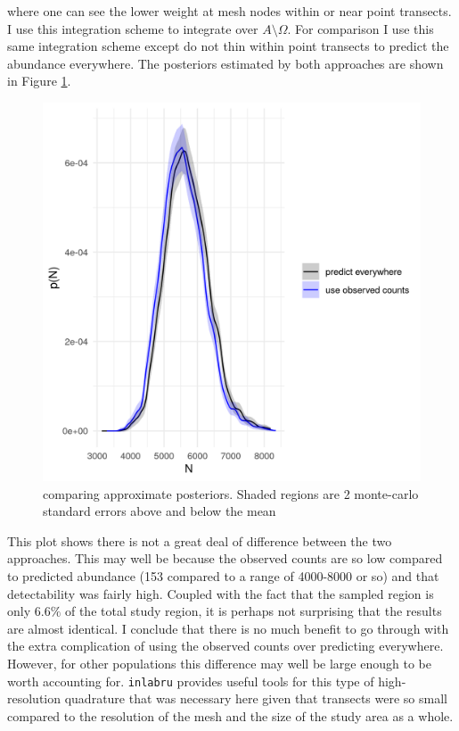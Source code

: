 \documentclass[12pt]{article}
\begin{document}
where one can see the lower weight at mesh nodes within or near point transects.  I use this integration scheme to integrate over $A \setminus \Omega$. For comparison I use this same integration scheme except do not thin within point transects to predict the abundance everywhere.  The posteriors estimated by both approaches are shown in Figure \ref{fig:compare_post_N}.
\begin{figure}
	\centering
	\includegraphics[width=\textwidth]{figures/compare_N_posteriors.png}
	\caption{comparing approximate posteriors.  Shaded regions are 2 monte-carlo standard errors above and below the mean}
	\label{fig:compare_post_N}
\end{figure}
This plot shows there is not a great deal of difference between the two approaches.  This may well be because the observed counts are so low compared to predicted abundance (153 compared to a range of 4000-8000 or so) and that detectability was fairly high.  Coupled with the fact that the sampled region is only $6.6\%$ of the total study region, it is perhaps not surprising that the results are almost identical.  I conclude that there is no much benefit to go through with the extra complication of using the observed counts over predicting everywhere.  However, for other populations this difference may well be large enough to be worth accounting for.  \texttt{inlabru} provides useful tools for this type of high-resolution quadrature that was necessary here given that transects were so small compared to the resolution of the mesh and the size of the study area as a whole.  
\end{document}
